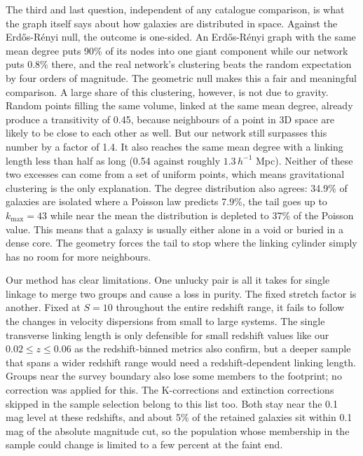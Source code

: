 \documentclass[9pt,a4paper,twocolumn,twoside]{rho-class/rho}
\begin{document}
The third and last question, independent of any catalogue comparison, is what the
graph itself says about how galaxies are distributed in space. Against the
Erd\H{o}s-R\'enyi null, the outcome is one-sided. An Erd\H{o}s-R\'enyi graph with the same mean
degree puts 90\% of its nodes into one giant component while our network
puts 0.8\% there, and the real network's clustering beats the random expectation by four
orders of magnitude. The
geometric null makes this a fair and meaningful comparison. A large share of this
clustering, however, is not due to gravity. Random points filling the same volume,
linked at the same mean degree, already produce a transitivity of 0.45, because 
neighbours of a point in 3D space are likely to be close to each other as well.
But our network still
surpasses this number by a factor of 1.4. It also reaches the same mean
degree with a linking length less than half as long (0.54 against roughly $1.3\,h^{-1}$ Mpc).
Neither of these two excesses can come from a set of
uniform points, which means gravitational clustering is the only explanation.
The degree distribution also agrees: 34.9\% of galaxies are isolated where a
Poisson law predicts 7.9\%, the tail goes up to $k_{\max} = 43$ while near
the mean the distribution is depleted to 37\% of the Poisson value. This means that
a galaxy is usually either alone in a void or buried in a dense core. The geometry forces
the tail to stop where the linking cylinder simply has no room for more
neighbours.

Our method has clear limitations. One unlucky pair is all it takes for
single linkage to merge two groups and cause a loss in purity. The fixed stretch
factor is another. Fixed at $S = 10$ throughout the entire redshift range, it
fails to follow the changes in velocity dispersions from small to large systems.
The single transverse linking length is only defensible for small redshift values like our 
$0.02 \le z \le
0.06$ as the redshift-binned metrics also confirm, but a deeper sample that spans a wider redshift range
would need a
redshift-dependent linking length. Groups near the survey boundary also lose some members to
the footprint; no correction was applied for this. The K-corrections and
extinction corrections skipped in the sample selection belong to this list
too. Both stay near the 0.1 mag level at these redshifts, and about 5\% of
the retained galaxies sit within 0.1 mag of the absolute magnitude cut, so
the population whose membership in the sample could change is limited to a
few percent at the faint end.
\end{document}
